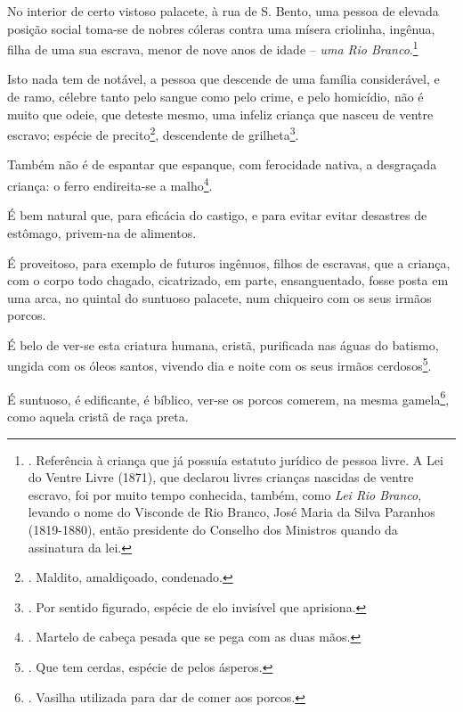 No interior de certo vistoso palacete, à rua de S. Bento, uma pessoa de
elevada posição social toma-se de nobres cóleras contra uma mísera
criolinha, ingênua, filha de uma sua escrava, menor de nove anos de
idade -- \emph{uma Rio Branco}.\footnote{. Referência à criança que já
  possuía estatuto jurídico de pessoa livre. A Lei do Ventre Livre
  (1871), que declarou livres crianças nascidas de ventre escravo, foi
  por muito tempo conhecida, também, como \emph{Lei Rio Branco}, levando
  o nome do Visconde de Rio Branco, José Maria da Silva Paranhos
  (1819-1880), então presidente do Conselho dos Ministros quando da
  assinatura da lei.}

Isto nada tem de notável, a pessoa que descende de uma família
considerável, e de ramo, célebre tanto pelo sangue como pelo crime, e
pelo homicídio, não é muito que odeie, que deteste mesmo, uma infeliz
criança que nasceu de ventre escravo; espécie de precito\footnote{.
  Maldito, amaldiçoado, condenado.}, descendente de grilheta\footnote{.
  Por sentido figurado, espécie de elo invisível que aprisiona.}.

Também não é de espantar que espanque, com ferocidade nativa, a
desgraçada criança: o ferro endireita-se a malho\footnote{. Martelo de
  cabeça pesada que se pega com as duas mãos.}.

É bem natural que, para eficácia do castigo, e para evitar evitar
desastres de estômago, privem-na de alimentos.

É proveitoso, para exemplo de futuros ingênuos, filhos de escravas, que
a criança, com o corpo todo chagado, cicatrizado, em parte,
ensanguentado, fosse posta em uma arca, no quintal do suntuoso palacete,
num chiqueiro com os seus irmãos porcos.

É belo de ver-se esta criatura humana, cristã, purificada nas águas do
batismo, ungida com os óleos santos, vivendo dia e noite com os seus
irmãos cerdosos\footnote{. Que tem cerdas, espécie de pelos ásperos.}.

É suntuoso, é edificante, é bíblico, ver-se os porcos comerem, na mesma
gamela\footnote{. Vasilha utilizada para dar de comer aos porcos.}, como
aquela cristã de raça preta.


